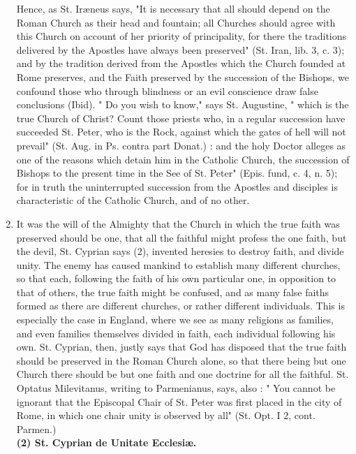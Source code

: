\documentclass[12pt]{book}
\begin{document}
\begin{enumerate}
Hence, as St. Ir{\ae}neus says, "It is necessary that all should depend on the Roman Church as their head and
fountain; all Churches should agree with this Church on account of her priority of principality, for there
the traditions delivered by the Apostles have always been preserved" (St. Iran, lib. 3, c. 3); and by the
tradition derived from the Apostles which the Church founded at Rome preserves, and the Faith
preserved by the succession of the Bishops, we confound those who through blindness or an evil
conscience draw false conclusions (Ibid). " Do you wish to know," says St. Augustine, " which is the true
Church of Christ? Count those priests who, in a regular succession have succeeded St. Peter, who is the
Rock, against which the gates of hell will not prevail" (St. Aug. in Ps. contra part Donat.) : and the holy
Doctor alleges as one of the reasons which detain him in the Catholic Church, the succession of Bishops to
the present time in the See of St. Peter" (Epis. fund, c. 4, n. 5); for in truth the uninterrupted succession
from the Apostles and disciples is characteristic of the Catholic Church, and of no other.

\item It was the will of the Almighty that the Church in which the true faith was preserved should be one,
that all the faithful might profess the one faith, but the devil, St. Cyprian says (2), invented heresies to
destroy faith, and divide unity. The enemy has caused mankind to establish many different churches, so
that each, following the faith of his own particular one, in opposition to that of others, the true faith might
be confused, and as many false faiths formed as there are different churches, or rather different
individuals. This is especially the case in England, where we see as many religions as families, and even
families themselves divided in faith, each individual following his own. St. Cyprian, then, justly says that
God has disposed that the true faith should be preserved in the Roman Church alone, so that there being
but one Church there should be but one faith and one doctrine for all the faithful. St. Optatus
Milevitanus, writing to Parmenianus, says, also : " You cannot be ignorant that the Episcopal Chair of St.
Peter was first placed in the city of Rome, in which one chair unity is observed by all" (St. Opt. I 2, cont.
Parmen.)\\
\textbf{(2) St. Cyprian de Unitate Ecclesi{\ae}.}


\end{enumerate}
\end{document}
